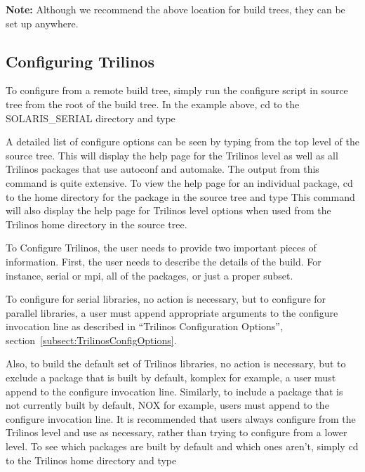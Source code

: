 \documentclass[12pt,relax]{TrilinosDevGuide}
\begin{document}
{\bf Note:} Although we recommend the above location for build trees,
they can be set up anywhere.

\subsection{Configuring Trilinos}
\label{Subsection:ConfiguringTrilinos}
	To configure from a remote build tree, simply run the configure script 
in source tree from the root of the build tree.  In the example above, cd to 
the SOLARIS\_SERIAL directory and type 

A detailed list of configure options can be seen by typing
 from the top level of the 
source tree.  This will display the help page for the Trilinos level as well as all 
Trilinos packages that use autoconf and automake.  The output from this command
is quite extensive.  To view the help page for an individual package, cd to 
the home directory for the package in the source tree and type 
This command will also display the help page for Trilinos level 
options when used from the Trilinos home directory in the source tree.


To Configure Trilinos, the user needs to provide two important pieces of 
information.  First, the user needs to describe the details of the build.  For 
instance, serial or mpi, all of the packages, or just a proper subset.  

To configure for serial libraries, no action is necessary,
but to configure for parallel libraries, a user must append appropriate 
arguments to the configure invocation line as described in ``Trilinos 
Configuration Options'', section~\ref{subsect:TrilinosConfigOptions}.

Also, to build the default set of Trilinos libraries, no action is 
necessary, but to exclude a package that is built by default, komplex for 
example, a user must append  to the configure 
invocation  line.  Similarly, to include a package that is not currently built 
by default, NOX for example, users must append  to 
the configure invocation line.  It is recommended that users always configure 
from the Trilinos level and use  as 
necessary, rather than trying to configure from a lower level.  To see which 
packages are built by default and which ones aren't, simply cd to the Trilinos home directory and type 
\end{document}
